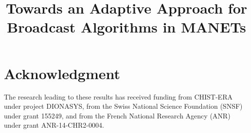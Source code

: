 \documentclass[conference]{./sty/IEEEtran}
\begin{document}
%
\title{Towards an Adaptive Approach for Broadcast Algorithms in MANETs}


\author{
}


\maketitle



%
\IEEEpeerreviewmaketitle







\section*{Acknowledgment}
The research leading to these results has received funding from CHIST-ERA under project DIONASYS, from the Swiss National Science Foundation (SNSF) under grant 155249, and from the French National Research Agency (ANR) under grant ANR-14-CHR2-0004.





\end{document}

